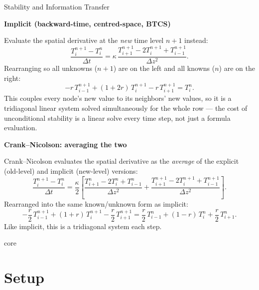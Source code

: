 \begin{activity}{Stability and Information Transfer}
{  \medskip
  \textbf{Implicit (backward-time, centred-space, BTCS)}

  Evaluate the spatial derivative at the \emph{new} time level $n+1$ instead:
  \[
    \frac{T_i^{n+1} - T_i^n}{\Delta t} = \kappa\,\frac{T_{i+1}^{n+1} - 2T_i^{n+1} + T_{i-1}^{n+1}}{\Delta z^2}.
  \]
  Rearranging so all unknowns ($n+1$) are on the left and all knowns ($n$) are on the right:
  \[
  -r\,T_{i-1}^{n+1} + (1+2r)\,T_i^{n+1} - r\,T_{i+1}^{n+1} = T_i^n.
  \]
  This couples every node's new value to its neighbors' new values, so it is a tridiagonal linear system solved simultaneously for the whole row --- the cost of unconditional stability is a linear solve every time step, not just a formula
  evaluation.

  \medskip
  \textbf{Crank--Nicolson: averaging the two}

  Crank--Nicolson evaluates the spatial derivative as the \emph{average} of the explicit
  (old-level) and implicit (new-level) versions:
  \[
  \frac{T_i^{n+1} - T_i^n}{\Delta t} = \frac{\kappa}{2}
  \left[\frac{T_{i+1}^{n} - 2T_i^{n} + T_{i-1}^{n}}{\Delta z^2}
  + \frac{T_{i+1}^{n+1} - 2T_i^{n+1} + T_{i-1}^{n+1}}{\Delta z^2}\right].
  \]
  Rearranged into the same known/unknown form as implicit:
  \[
  -\frac{r}{2}\,T_{i-1}^{n+1} + (1+r)\,T_i^{n+1} - \frac{r}{2}\,T_{i+1}^{n+1}
  = \frac{r}{2}\,T_{i-1}^{n} + (1-r)\,T_i^{n} + \frac{r}{2}\,T_{i+1}^{n}.
  \]
  Like implicit, this is a tridiagonal system each step.
}{core}


\section*{Setup}


\end{activity}
